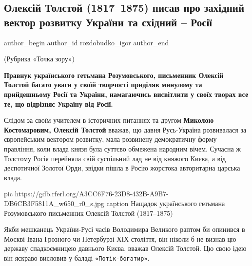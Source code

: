  
 
 
 
 
 
\subsection{Олексій Толстой (1817–1875) писав про західний вектор розвитку України та східний – Росії}
\label{sec:29_11_2020.news.ua.radio_svoboda.rozdobudko_igor.1.russia_oleksii_tolstoj}
\ifcmt
  author_begin
   author_id rozdobudko_igor
  author_end
\fi


  

(Рубрика «Точка зору»)

\begin{leftbar}
  \bfseries
Правнук українського гетьмана Розумовського, письменник Олексій Толстой багато
уваги у своїй творчості приділяв минулому та прийдешньому Росії та України,
намагаючись висвітлити у своїх творах все те, що відрізняє Україну від Росії.
\end{leftbar}

Слідом за своїм учителем в історичних питаннях та другом \textbf{Миколою Костомаровим,
Олексій Толстой} вважав, що давня Русь-Україна розвивалася за європейським
вектором розвитку, мала розвинену демократичну форму правління, коли влада
князя була суттєво обмежена народним вічем. Сучасна ж Толстому Росія перейняла
свій суспільний лад не від княжого Києва, а від деспотичної Золотої Орди,
звідки пішла в Росію жорстока авторитарна царська влада.

\ifcmt
pic https://gdb.rferl.org/A3CC6F76-23D8-432B-A9B7-DB6CB3F5811A_w650_r0_s.jpg
caption Нащадок українського гетьмана Розумовського письменник Олексій Толстой (1817–1875)
\fi

Якби мешканець України-Русі часів Володимира Великого раптом би опинився в
Москві Івана Грозного чи Петербурзі ХІХ століття, він ніколи б не визнав цю
державу спадкоємницею давнього Києва, вважав Олексій Толстой. Цю свою ідею він
яскраво висловив у баладі \verb|«Потік-богатир»|.

